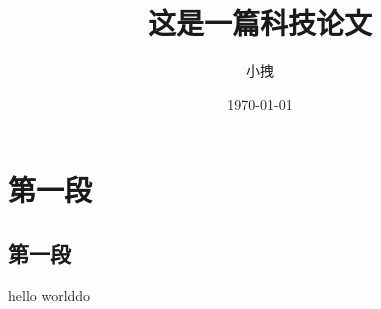 \documentclass{article}
\title{这是一篇科技论文}
\date{\today}
\author{小拽}
\begin{document}
\maketitle
\section{第一段}
\subsection{第一段}
hello worlddo
\end{document}
